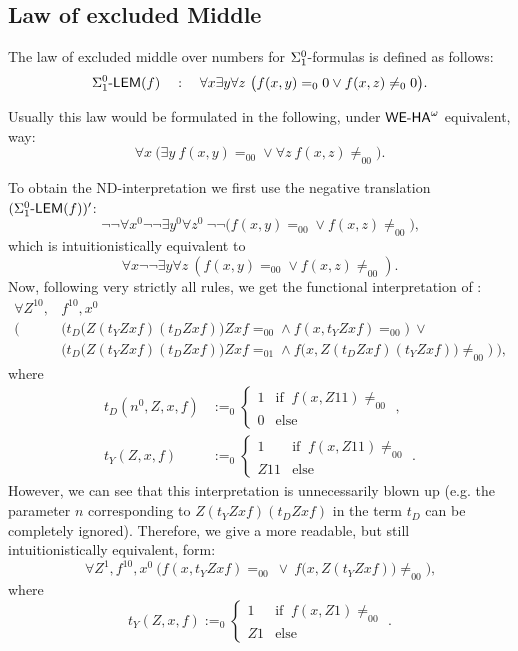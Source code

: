 \subsection{Law of excluded Middle} \label{ss:LEM}
The law of excluded middle over numbers for $\Sigma^0_1$-formulas is defined as follows:
\[ 
 \defkeyn{\text{$\LEM(f)$}}\quad:\quad\forall x\exists y\forall z\  \big(f(x,y)=_00 \vee f(x,z)\neq_00\big)  
\text{.}\]
\begin{rmk}
Usually this law would be formulated in the following, under ${\textsf{\upshape WE-HA}}^{\omega}$ equivalent, way:
\[ 
 \forall x\ \big(\exists y\ f(x,y)=_00 \vee \forall z\ f(x,z)\neq_00\big)  
\text{.}\]
\end{rmk}
To obtain the ND-interpretation we first use the negative translation $(\Sigma^0_1\textsf{\upshape -LEM}(f))'$:
\[\neg\neg\forall x^0\neg\neg\exists y^0\forall z^0\ 
          \neg\neg\big(f(x,y)=_00 \vee f(x,z)\neq_00\big)\text{,}\]
which is intuitionistically equivalent to
\[ \forall x\neg\neg\exists y\forall z\ (f(x,y)=_00 \vee f(x,z)\neq_00)  \text{.}\]
Now, following very strictly all rules, we get the functional 
interpretation of :
\begin{align*}
 \forall Z^{10},&f^{10},x^0\\
       \bigg(\ &\Big(t_D\big(Z(t_YZxf)(t_DZxf)\big)Zxf=_00\wedge f(x,t_YZxf)=_00\Big)\ \vee \\
          &\Big(t_D\big(Z(t_YZxf)(t_DZxf)\big)Zxf=_01\wedge f\big(x,Z(t_DZxf)(t_YZxf)\big)\neq_00\Big)\ \bigg) \text{,} 
\end{align*}
 where
\begin{align*}
  t_D(n^0,Z,x,f)&:=_0 \begin{cases}1&\text{if }\ f(x,Z11)\neq_00 \\ 0  &\text{else}\end{cases}
      \text{,}\\
  t_Y(Z,x,f)&:=_0 \begin{cases}1&\text{if }\ f(x,Z11)\neq_00 \\ Z11&\text{else}\end{cases}
\text{.}
\end{align*}
However, we can see that this interpretation is unnecessarily blown up (e.g. the
parameter $n$ corresponding to $Z(t_YZxf)(t_DZxf)$ in the term $t_D$
can be completely ignored). Therefore, we give
a more readable, but still intuitionistically equivalent, form:
\[
 \forall Z^1,f^{10},x^0\ \Big( f(x,t_YZxf)=_00\ \vee\ f\big(x,Z(t_YZxf)\big)\neq_00 \Big)
 \text{,}
\] where \[ 
t_Y(Z,x,f):=_0 \begin{cases}1&\text{if }\ f(x,Z1)\neq_00 \\ Z1&\text{else}\end{cases}
\text{.}\]


